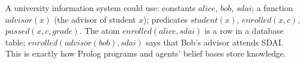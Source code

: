 \begin{nbwhy}
\notinslides
A university information system could use: constants $\mathit{alice}$, $\mathit{bob}$,
$\mathit{sdai}$; a function $\mathit{advisor}(x)$ (the advisor of student $x$); predicates
$\mathit{student}(x)$, $\mathit{enrolled}(x, c)$, $\mathit{passed}(x, c, \mathit{grade})$.
The atom $\mathit{enrolled}(\mathit{alice}, \mathit{sdai})$ is a row in a database table;
$\mathit{enrolled}(\mathit{advisor}(\mathit{bob}), \mathit{sdai})$ says that Bob's advisor
attends SDAI. This is exactly how Prolog programs and agents' belief bases store knowledge.
\end{nbwhy}
